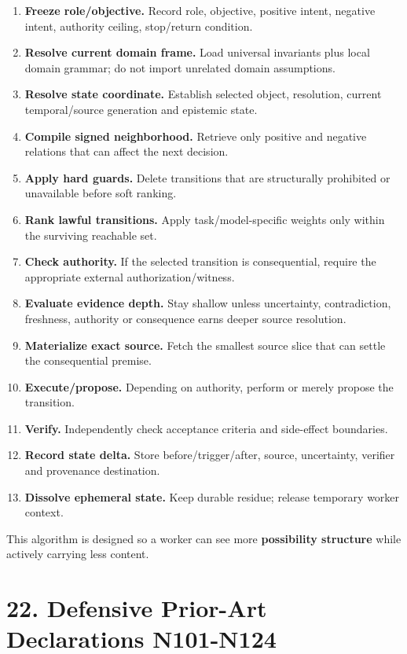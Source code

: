 \documentclass[
  10pt,
  letterpaper,
]{article}
\providecommand{\tightlist}{%
  \setlength{\itemsep}{0pt}\setlength{\parskip}{0pt}}
\begin{document}
\begin{enumerate}
\def\labelenumi{\arabic{enumi}.}
\tightlist
\item
  \textbf{Freeze role/objective.} Record role, objective, positive
  intent, negative intent, authority ceiling, stop/return condition.
\item
  \textbf{Resolve current domain frame.} Load universal invariants plus
  local domain grammar; do not import unrelated domain assumptions.
\item
  \textbf{Resolve state coordinate.} Establish selected object,
  resolution, current temporal/source generation and epistemic state.
\item
  \textbf{Compile signed neighborhood.} Retrieve only positive and
  negative relations that can affect the next decision.
\item
  \textbf{Apply hard guards.} Delete transitions that are structurally
  prohibited or unavailable before soft ranking.
\item
  \textbf{Rank lawful transitions.} Apply task/model-specific weights
  only within the surviving reachable set.
\item
  \textbf{Check authority.} If the selected transition is consequential,
  require the appropriate external authorization/witness.
\item
  \textbf{Evaluate evidence depth.} Stay shallow unless uncertainty,
  contradiction, freshness, authority or consequence earns deeper source
  resolution.
\item
  \textbf{Materialize exact source.} Fetch the smallest source slice
  that can settle the consequential premise.
\item
  \textbf{Execute/propose.} Depending on authority, perform or merely
  propose the transition.
\item
  \textbf{Verify.} Independently check acceptance criteria and
  side-effect boundaries.
\item
  \textbf{Record state delta.} Store before/trigger/after, source,
  uncertainty, verifier and provenance destination.
\item
  \textbf{Dissolve ephemeral state.} Keep durable residue; release
  temporary worker context.
\end{enumerate}

This algorithm is designed so a worker can see more \textbf{possibility
structure} while actively carrying less content.

\section{22. Defensive Prior-Art Declarations
N101-N124}\label{22-defensive-prior-art-declarations-n101-n124}
\end{document}
